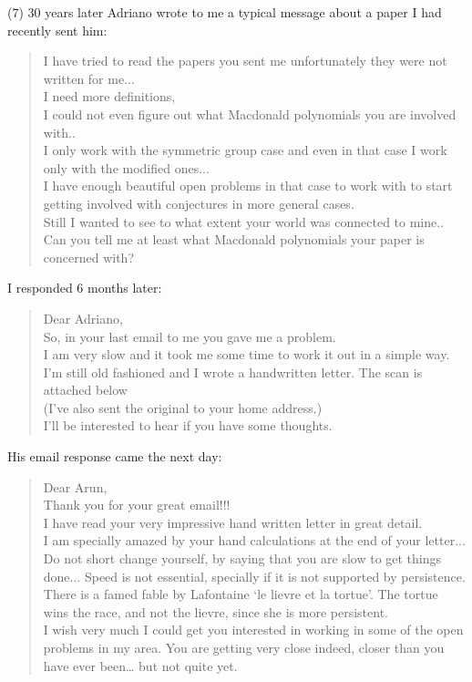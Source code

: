 \documentclass{notices}
\begin{document}
(7) 30 years later Adriano wrote to me a typical message about a paper I had recently sent him:
\begin{quote}
I have tried to read the papers you sent me
unfortunately they were not written for me...\\
I need more definitions,\\
I could not even figure out what Macdonald polynomials you are involved with..\\
I only work with the symmetric group case and
even in that case
I work only with the modified ones...\\
I have enough beautiful open problems in that case to work with
to start getting involved with conjectures in more general cases.\\
Still I wanted to see to what extent your world was connected to mine..\\
Can you tell me at least what Macdonald polynomials your paper is concerned with?
\end{quote}

I responded 6 months later:
\begin{quote}
Dear Adriano,\\
So, in your last email to me you gave me a problem.\\
I am very slow and it took me some time to work it out in a simple way.
I'm still old fashioned and I wrote a handwritten letter.
The scan is attached below\\
(I've also sent the original to your home address.)\\

I'll be interested to hear if you have some thoughts.
\end{quote}

His email response came the next day:
\begin{quote}
Dear Arun,\\
Thank you for your great email!!!\\
I have read your very impressive hand written letter in great detail.\\
I am specially amazed by your hand calculations at the end of your letter...\\
Do not short change yourself, by saying that you are slow to get things done...
Speed is not essential, specially if it is not supported by persistence.
There is a famed fable by Lafontaine `le lievre et la tortue'.
The tortue wins the race, and not the lievre, since she is more persistent.\\
I wish very much I could get you interested in working in some of the open problems in my area.
You are getting very close indeed,
closer than you have ever been…
but not quite yet.
\end{quote}
\end{document}

